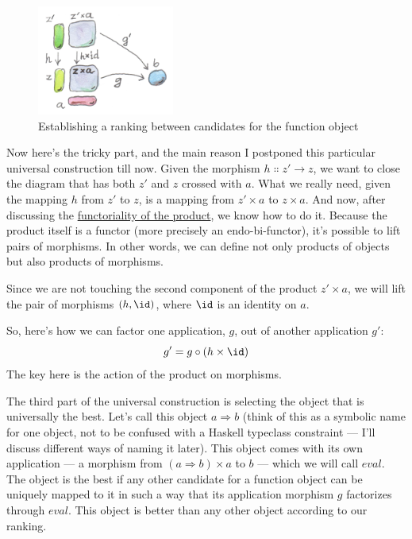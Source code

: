 \begin{figure}[H]
\centering
\includegraphics[width=0.4\textwidth]{images/functionranking.jpg}
\caption{Establishing a ranking between candidates for the function object}
\end{figure}

\noindent
Now here's the tricky part, and the main reason I postponed this
particular universal construction till now. Given the morphism
$h \Colon z'\to z$, we want to close the diagram
that has both $z'$ and $z$ crossed with $a$.
What we really need, given the mapping $h$ from $z'$
to $z$, is a mapping from $z' \times a$ to $z \times a$.
And now, after discussing the \hyperref[functoriality]{functoriality
of the product}, we know how to do it. Because the product itself is a
functor (more precisely an endo-bi-functor), it's possible to lift pairs
of morphisms. In other words, we can define not only products of objects
but also products of morphisms.

Since we are not touching the second component of the product
$z' \times a$, we will lift the pair of morphisms
$(h, \id)$, where $\id$ is an identity on $a$.

So, here's how we can factor one application, $g$, out of another
application $g'$:
\[g' = g \circ (h \times \id)\]
The key here is the action of the product on morphisms.

The third part of the universal construction is selecting the object
that is universally the best. Let's call this object $a \Rightarrow b$ (think
of this as a symbolic name for one object, not to be confused with a
Haskell typeclass constraint --- I'll discuss different ways of naming
it later). This object comes with its own application --- a morphism
from $(a \Rightarrow b) \times a$ to $b$ --- which we will call
$eval$. The object  is the best if any other
candidate for a function object can be uniquely mapped to it in such a
way that its application morphism $g$ factorizes through
$eval$. This object is better than any other object according to
our ranking.

